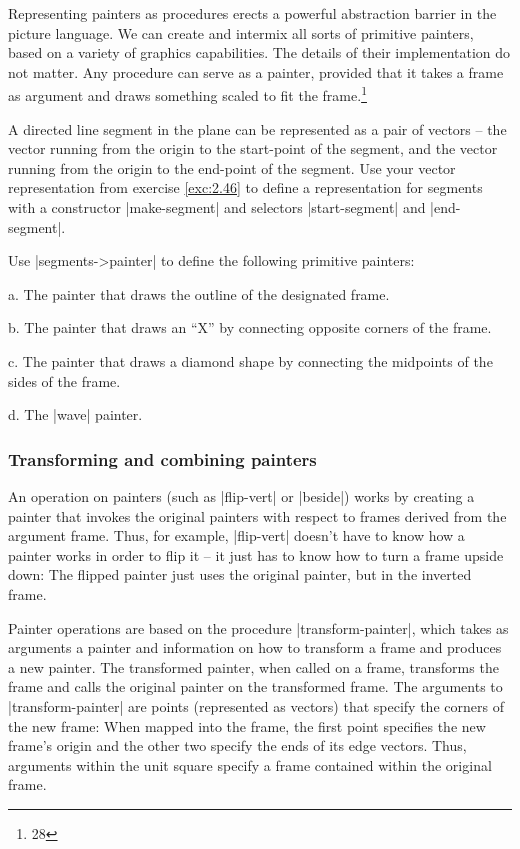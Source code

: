 \begin{Exercise}
\begin{Exercise}
\begin{Exercise}
\begin{Exercise}
\begin{Exercise}
\begin{Exercise}
\begin{Exercise}
Representing painters as procedures erects a powerful abstraction
barrier in the picture language.  We can create and intermix
all sorts of primitive painters, based on a variety of graphics
capabilities. The details of their implementation do not matter.  Any
procedure can serve as a painter, provided that it takes a frame as
argument and draws something scaled to fit the frame.\footnote{28}

\begin{Exercise}
\label{exc:2.48}
A directed line segment in the
plane can be represented as a pair of vectors -- the
vector running from the origin to the start-point of the segment, and
the vector running from the origin to the end-point of the segment.
Use your vector representation from exercise \ref{exc:2.46} to
define a representation for segments with a constructor \scheme|make-segment| and selectors \scheme|start-segment| and \scheme|end-segment|.



\begin{Exercise}
\label{exc:2.49}
Use \scheme|segments->painter| to define the following primitive painters:

a.  The painter that draws the outline of the designated frame.

b.  The painter that draws an ``X'' by connecting opposite corners of
the frame.

c.  The painter that draws a diamond shape by connecting the midpoints of
the sides of the frame.

d.  The \scheme|wave| painter.




\subsubsection*{Transforming and combining painters}


An operation on painters (such as \scheme|flip-vert| or \scheme|beside|)
works by creating a painter that invokes the original painters
with respect to frames derived from the argument frame.
Thus, for example, \scheme|flip-vert| doesn't have to know how a painter
works in order to flip it -- it just has to know how to turn a frame
upside down:
The flipped painter just uses the original painter,
but in the inverted frame.

Painter operations are based on
the procedure \scheme|transform-painter|, which takes as arguments a painter and
information on how to transform a frame and
produces a new painter.  The transformed painter, when called on a frame,
transforms the frame and
calls the original painter on the transformed frame.
The arguments to \scheme|transform-painter| are points (represented as vectors)
that specify the corners of the new frame:
When mapped into
the frame, the first point specifies the new frame's origin
and the other two specify the ends of its edge vectors.
Thus, arguments within the
unit square specify a frame contained within the original frame.


\end{Exercise}
\end{Exercise}
\end{Exercise}
\end{Exercise}
\end{Exercise}
\end{Exercise}
\end{Exercise}
\end{Exercise}
\end{Exercise}
